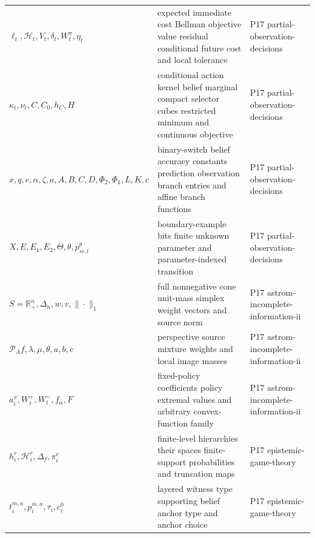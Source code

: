 \begin{longtable}{@{}p{}p{}p{}@{}}
\(\ell_t,\allowbreak \mathcal H_t,\allowbreak V_t,\allowbreak \delta_t,\allowbreak W_t^\pi,\allowbreak \eta_t\) & expected immediate cost Bellman objective value residual conditional future cost and local tolerance & P17 partial-\allowbreak{}observation-\allowbreak{}decisions \\
\(\kappa_t,\allowbreak \nu_t,\allowbreak C,\allowbreak C_0,\allowbreak h_C,\allowbreak H\) & conditional action kernel belief marginal compact selector cubes restricted minimum and continuous objective & P17 partial-\allowbreak{}observation-\allowbreak{}decisions \\
\(x,\allowbreak q,\allowbreak e,\allowbreak \alpha,\allowbreak \zeta,\allowbreak a,\allowbreak A,\allowbreak B,\allowbreak C,\allowbreak D,\allowbreak \Phi_2,\allowbreak \Phi_1,\allowbreak L,\allowbreak K,\allowbreak c\) & binary-switch belief accuracy constants prediction observation branch entries and affine branch functions & P17 partial-\allowbreak{}observation-\allowbreak{}decisions \\
\(X,\allowbreak E,\allowbreak E_1,\allowbreak E_2,\allowbreak \Theta,\allowbreak \theta,\allowbreak p_{si,t}^{\theta}\) & boundary-example bits finite unknown parameter and parameter-indexed transition & P17 partial-\allowbreak{}observation-\allowbreak{}decisions \\
\(S=\mathbb R_+^n,\allowbreak \Delta_n,\allowbreak w,\allowbreak v,\allowbreak \|\cdot\|_1\) & full nonnegative cone unit-mass simplex weight vectors and source norm & P17 astrom-\allowbreak{}incomplete-\allowbreak{}information-\allowbreak{}ii \\
\(\mathcal P_A f,\allowbreak \lambda,\allowbreak \mu,\allowbreak \theta,\allowbreak a,\allowbreak b,\allowbreak c\) & perspective source mixture weights and local image masses & P17 astrom-\allowbreak{}incomplete-\allowbreak{}information-\allowbreak{}ii \\
\(a_i^\pi,\allowbreak W_t^+,\allowbreak W_t^-,\allowbreak f_\alpha,\allowbreak F\) & fixed-policy coefficients policy extremal values and arbitrary convex-function family & P17 astrom-\allowbreak{}incomplete-\allowbreak{}information-\allowbreak{}ii \\
\(h_i^r,\allowbreak \mathcal H_i^r,\allowbreak \Delta_f,\allowbreak \pi_i^r\) & finite-level hierarchies their spaces finite-support probabilities and truncation maps & P17 epistemic-\allowbreak{}game-\allowbreak{}theory \\
\(t_i^{m,a},\allowbreak p_i^{m,a},\allowbreak \tau_i,\allowbreak c_i^0\) & layered witness type supporting belief anchor type and anchor choice & P17 epistemic-\allowbreak{}game-\allowbreak{}theory \\

\end{longtable}

